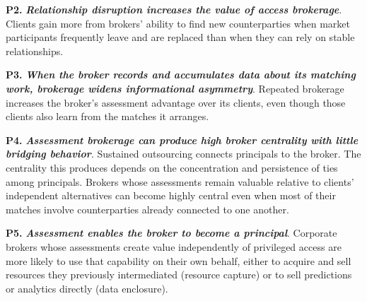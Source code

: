 \noindent\textbf{P2.} \textbf{\textit{Relationship disruption increases the value of access brokerage}}. Clients gain more from brokers' ability to find new counterparties when market participants frequently leave and are replaced than when they can rely on stable relationships.

\noindent\textbf{P3.} \textbf{\textit{When the broker records and accumulates data about its matching work, brokerage widens informational asymmetry}}. Repeated brokerage increases the broker's assessment advantage over its clients, even though those clients also learn from the matches it arranges.

\noindent\textbf{P4.} \textbf{\textit{Assessment brokerage can produce high broker centrality with little bridging behavior}}. Sustained outsourcing connects principals to the broker. The centrality this produces depends on the concentration and persistence of ties among principals. Brokers whose assessments remain valuable relative to clients' independent alternatives can become highly central even when most of their matches involve counterparties already connected to one another.

\noindent\textbf{P5.} \textbf{\textit{Assessment enables the broker to become a principal}}. Corporate brokers whose assessments create value independently of privileged access are more likely to use that capability on their own behalf, either to acquire and sell resources they previously intermediated (resource capture) or to sell predictions or analytics directly (data enclosure).
